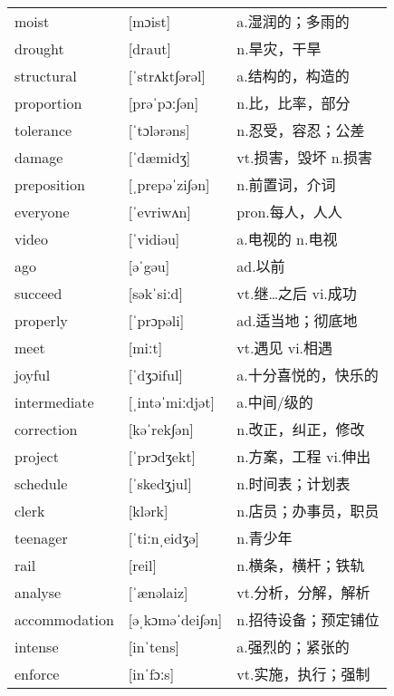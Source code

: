 \documentclass[a4paper]{article}
\begin{document}
\section{}
\begin{tabular}{l l l}

moist & [mɔist] & a.湿润的；多雨的 \\
drought & [draut] & n.旱灾，干旱 \\
structural & [ˈstrʌkt∫ərəl] & a.结构的，构造的 \\
proportion & [prəˈpɔː∫ən] & n.比，比率，部分 \\
tolerance & [ˈtɔlərəns] & n.忍受，容忍；公差 \\
damage & [ˈdæmidʒ] & vt.损害，毁坏 n.损害 \\
preposition & [ˌprepəˈzi∫ən] & n.前置词，介词 \\
everyone & [ˈevriwʌn] & pron.每人，人人 \\
video & [ˈvidiəu] & a.电视的 n.电视 \\
ago & [əˈgəu] & ad.以前 \\
succeed & [səkˈsiːd] & vt.继…之后 vi.成功 \\
properly & [ˈprɔpəli] & ad.适当地；彻底地 \\
meet & [miːt] & vt.遇见 vi.相遇 \\
joyful & [ˈdʒɔiful] & a.十分喜悦的，快乐的 \\
intermediate & [ˌintəˈmiːdjət] & a.中间/级的 \\
correction & [kəˈrek∫ən] & n.改正，纠正，修改 \\
project & [ˈprɔdʒekt] & n.方案，工程 vi.伸出 \\
schedule & [ˈskedʒjul] & n.时间表；计划表 \\
clerk & [klərk] & n.店员；办事员，职员 \\
teenager & [ˈtiːnˌeidʒə] & n.青少年 \\
rail & [reil] & n.横条，横杆；铁轨 \\
analyse & [ˈænəlaiz] & vt.分析，分解，解析 \\
accommodation & [əˌkɔməˈdei∫ən] & n.招待设备；预定铺位 \\
intense & [inˈtens] & a.强烈的；紧张的 \\
enforce & [inˈfɔːs] & vt.实施，执行；强制 \\

\end{tabular}
\end{document}
